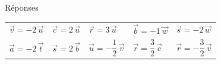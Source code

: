 \documentclass[border=4pt]{standalone}
\begin{document}
\begin{minipage}{16cm}\large \begin{minipage}{15.5cm}{\color{vert}\Large Réponses}\par\vspace{6pt}\renewcommand{\arraystretch}{1.6}\begin{tabular}{lllll}$\vec{v}=-2\,\vec{u}$ & $\vec{c}=2\,\vec{u}$ & $\vec{r}=3\,\vec{u}$ & $\vec{b}=-1\,\vec{w}$ & $\vec{s}=-2\,\vec{w}$\\$\vec{a}=-2\,\vec{t}$ & $\vec{s}=2\,\vec{b}$ & $\vec{u}=-\dfrac12\,\vec{v}$ & $\vec{r}=\dfrac32\,\vec{c}$ & $\vec{r}=-\dfrac32\,\vec{v}$\end{tabular}\par{}\end{minipage}\end{minipage}
\end{document}
